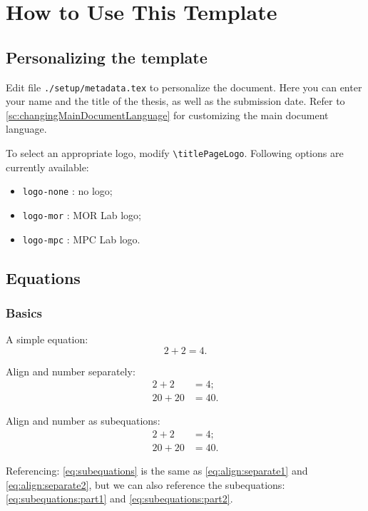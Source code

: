 \chapter{How to Use This Template}


\section{Personalizing the template}
Edit file \verb|./setup/metadata.tex| to personalize the document. Here
you can enter your name and the title of the thesis, as well as the submission
date. Refer to \cref{sc:changingMainDocumentLanguage} for customizing the main
document language.

To select an appropriate logo, modify \verb|\titlePageLogo|. Following options
are currently available:
\begin{itemize}
  \item \verb|logo-none| : no logo;
  \item \verb|logo-mor| : MOR Lab logo;
  \item \verb|logo-mpc| : MPC Lab logo.
\end{itemize}


\section{Equations}
\subsection{Basics}
A simple equation:
\begin{equation}
  \label{eq:simple}
  2 + 2 = 4.
\end{equation}

Align and number separately:
\begin{align}
  \label{eq:align:separate1}
  2 + 2 &= 4; \\
  \label{eq:align:separate2}
  20 + 20 &= 40.
\end{align}

Align and number as subequations:
\begin{subequations}
  \label{eq:subequations}
  \begin{align}
    \label{eq:subequations:part1}
    2 + 2 &= 4; \\
    \label{eq:subequations:part2}
    20 + 20 &= 40.
  \end{align}
\end{subequations}

Referencing: \cref{eq:subequations} is the same as
\cref{eq:align:separate1} and \cref{eq:align:separate2},
but we can also reference the subequations:
\cref{eq:subequations:part1} and \cref{eq:subequations:part2}.

